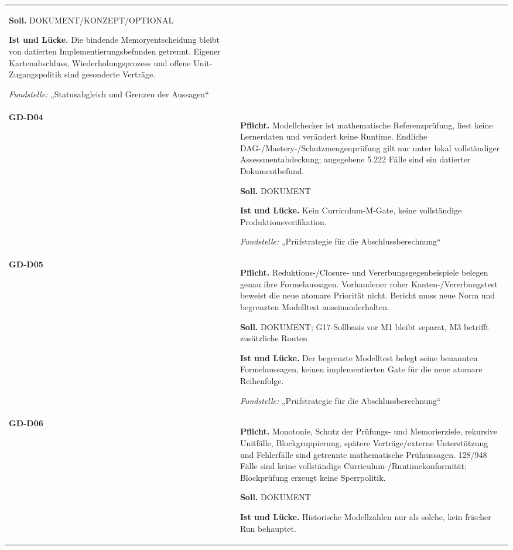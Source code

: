 \begin{longtable}{@{}P{20mm}P{128mm}@{}}
\textbf{Soll.} DOKUMENT/KONZEPT/OPTIONAL\par\smallskip
\textbf{Ist und Lücke.} Die bindende Memoryentscheidung bleibt von datierten Implementierungsbefunden getrennt. Eigener Kartenabschluss, Wiederholungsprozess und offene Unit-Zugangspolitik sind gesonderte Verträge.\par\smallskip
\emph{Fundstelle:} „Statusabgleich und Grenzen der Aussagen“\\\addlinespace[5pt]
\label{rule:GD-D04}\textbf{GD-D04} &
\textbf{Pflicht.} Modellchecker ist mathematische Referenzprüfung, liest keine Lernerdaten und verändert keine Runtime. Endliche DAG-/Mastery-/Schutzmengenprüfung gilt nur unter lokal vollständiger Assessmentabdeckung; angegebene 5.222 Fälle sind ein datierter Dokumentbefund.\par\smallskip
\textbf{Soll.} DOKUMENT\par\smallskip
\textbf{Ist und Lücke.} Kein Curriculum-M-Gate, keine vollständige Produktionsverifikation.\par\smallskip
\emph{Fundstelle:} „Prüfstrategie für die Abschlussberechnung“\\\addlinespace[5pt]
\label{rule:GD-D05}\textbf{GD-D05} &
\textbf{Pflicht.} Reduktions-/Closure- und Vererbungsgegenbeispiele belegen genau ihre Formelaussagen. Vorhandener roher Kanten-/Vererbungstest beweist die neue atomare Priorität nicht. Bericht muss neue Norm und begrenzten Modelltest auseinanderhalten.\par\smallskip
\textbf{Soll.} DOKUMENT; G17-Sollbasis vor M1 bleibt separat, M3 betrifft zusätzliche Routen\par\smallskip
\textbf{Ist und Lücke.} Der begrenzte Modelltest belegt seine benannten Formelaussagen, keinen implementierten Gate für die neue atomare Reihenfolge.\par\smallskip
\emph{Fundstelle:} „Prüfstrategie für die Abschlussberechnung“\\\addlinespace[5pt]
\label{rule:GD-D06}\textbf{GD-D06} &
\textbf{Pflicht.} Monotonie, Schutz der Prüfungs- und Memorierziele, rekursive Unitfälle, Blockgruppierung, spätere Verträge/externe Unterstützung und Fehlerfälle sind getrennte mathematische Prüfaussagen. 128/948 Fälle sind keine vollständige Curriculum-/Runtimekonformität; Blockprüfung erzeugt keine Sperrpolitik.\par\smallskip
\textbf{Soll.} DOKUMENT\par\smallskip
\textbf{Ist und Lücke.} Historische Modellzahlen nur als solche, kein frischer Run behauptet.\par\smallskip

\end{longtable}
